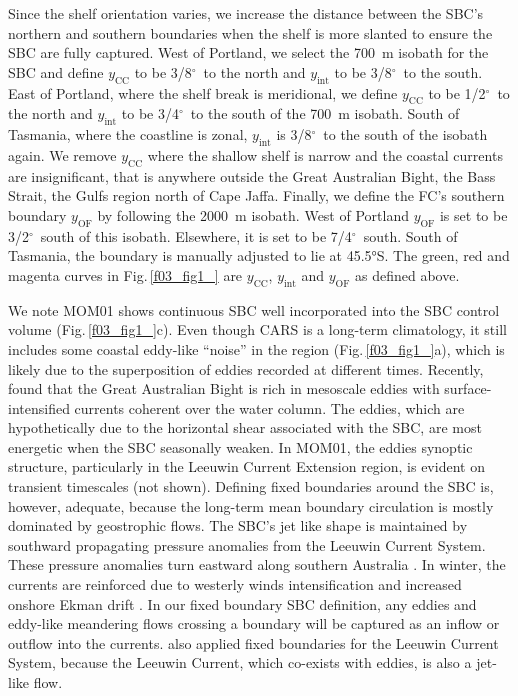\documentclass[preprint,3p,review,12pt]{elsarticle}
\newcommand{\SIadj}[2]{\SI[number-unit-product={\text{-}}]{#1}{#2}}
\newcommand{\dg}{$^{\circ}$}
\newcommand{\sub}[1]{_{\text{#1}}}
\begin{document}
Since the shelf orientation varies, we increase the distance between the SBC's northern and southern boundaries when the shelf is more slanted to ensure the SBC are fully captured. West of Portland, we select the \SIadj{700}{\meter} isobath for the SBC and define $y\sub{CC}$ to be 3/8\dg~to the north and $y\sub{int}$ to be 3/8\dg~to the south. East of Portland, where the shelf break is meridional, we define $y\sub{CC}$ to be 1/2\dg~to the north and $y\sub{int}$ to be 3/4\dg~to the south of the \SIadj{700}{\meter} isobath. South of Tasmania, where the coastline is zonal, $y\sub{int}$ is 3/8\dg~to the south of the isobath again.
We remove $y\sub{CC}$ where the shallow shelf is narrow and the coastal currents are insignificant, that is anywhere outside the Great Australian Bight, the Bass Strait, the Gulfs region north of Cape Jaffa. Finally, we define the FC's southern boundary $y\sub{OF}$ by following the \SIadj{2000}{\meter} isobath. West of Portland $y\sub{OF}$ is set to be 3/2\dg~south of this isobath. Elsewhere, it is set to be 7/4\dg~south. South of Tasmania, the boundary is manually adjusted to lie at \ang{45.5}S.
The green, red and magenta curves in Fig.\,\ref{f03_fig1_} are $y\sub{CC}$, $y\sub{int}$ and $y\sub{OF}$ as defined above.

We note MOM01 shows continuous SBC well incorporated into the SBC control volume (Fig.\,\ref{f03_fig1_}c). Even though CARS is a long-term climatology, it still includes some coastal eddy-like ``noise'' in the region (Fig.\,\ref{f03_fig1_}a), which is likely due to the superposition of eddies recorded at different times. Recently, \citet{Oke2018} found that the Great Australian Bight is rich in mesoscale eddies with surface-intensified currents coherent over the water column. The eddies, which are hypothetically due to the horizontal shear associated with the SBC, are most energetic when the SBC seasonally weaken. In MOM01, the eddies synoptic structure, particularly in the Leeuwin Current Extension region, is evident on transient timescales (not shown). Defining fixed boundaries around the SBC is, however, adequate, because the long-term mean boundary circulation is mostly dominated by geostrophic flows. The SBC's jet like shape is maintained by southward propagating pressure anomalies from the Leeuwin Current System. These pressure anomalies turn eastward along southern Australia \citep{Middleton2007, Ridgway2015}. In winter, the currents are reinforced due to westerly winds intensification and increased onshore Ekman drift \citep{Ridgway2004}. In our fixed boundary SBC definition, any eddies and eddy-like meandering flows crossing a boundary will be captured as an inflow or outflow into the currents. \citet{Furue2017} also applied fixed boundaries for the Leeuwin Current System, because the Leeuwin Current, which co-exists with eddies, is also a jet-like flow.
\end{document}
